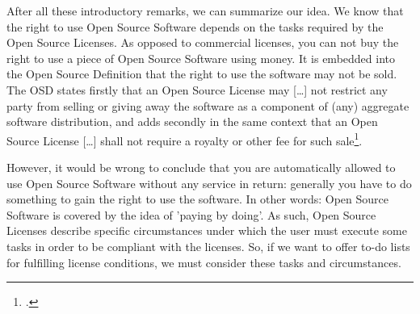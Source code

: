 %
%
%
%
%




After all these introductory remarks, we can summarize our idea. We know that
the right to use Open Source Software depends on the tasks required by the Open
Source Licenses. As opposed to commercial licenses, you can not buy the right to
use a piece of Open Source Software using money. It is embedded into the Open
Source Definition that the right to use the software may not be sold. The OSD
states firstly that an Open Source License may \glqq{}[\ldots] not restrict any
party from selling or giving away the software as a component of (any) aggregate
software distribution\grqq{}, and adds secondly in the same context that an Open
Source License \glqq{}[\ldots] shall not require a royalty or other fee for such
sale\grqq{}\footcite[cf.][\nopage wp. §1]{OSI2012a}.

However, it would be wrong to conclude that you are automatically allowed to use
Open Source Software without any service in return: generally you have to do
something to gain the right to use the software. In other words: Open Source
Software is covered by the idea of ’paying by doing’. As such, Open Source
Li\-cen\-ses describe specific circumstances under which the user must execute
some tasks in order to be compliant with the licenses. So, if we want to offer
to-do lists for fulfilling license conditions, we must consider these tasks and
circumstances.

